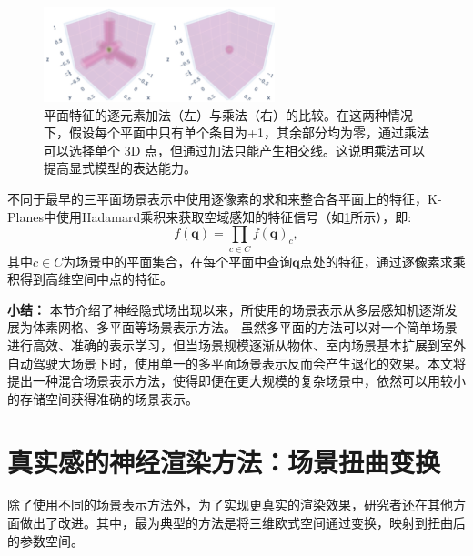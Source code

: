 \begin{figure}[ht]
    \centering
    \includegraphics[width=0.6\textwidth]{undergraduate-thesis/images/related-work/hadamard-product.png}
    \caption{平面特征的逐元素加法（左）与乘法（右）的比较。在这两种情况下，假设每个平面中只有单个条目为+1，其余部分均为零，通过乘法可以选择单个 3D 点，但通过加法只能产生相交线。这说明乘法可以提高显式模型的表达能力\cite{fridovich-keil_k-planes_2023}。}
    \label{fig:related-work hadamard-product}
\end{figure}

不同于最早的三平面场景表示\cite{chan_efficient_2022}中使用逐像素的求和来整合各平面上的特征，K-Planes中使用Hadamard乘积来获取空域感知的特征信号（如\ref{fig:related-work hadamard-product}所示），即:
\begin{equation}
    f(\mathbf{q}) = \prod_{c\in C}f(\mathbf{q})_c,
\end{equation}
其中$c\in C$为场景中的平面集合，在每个平面中查询$\mathbf{q}$点处的特征，通过逐像素求乘积得到高维空间中点的特征。

\noindent\textbf{小结：}
本节介绍了神经隐式场出现以来，所使用的场景表示从多层感知机\cite{mildenhall_nerf_2020,park_deepsdf_2019, mescheder_occupancy_2019, shim_snerl_2023, zhi_-place_2021}逐渐发展为体素网格\cite{fridovich-keil_plenoxels_2022,yu_monosdf_2022,muller_instant_2022,jiang_instantavatar_2022}、多平面\cite{chen_tensorf_2022,fridovich-keil_k-planes_2023,cao_hexplane_2023}等场景表示方法。
虽然多平面的方法可以对一个简单场景进行高效、准确的表示学习，但当场景规模逐渐从物体、室内场景基本扩展到室外自动驾驶大场景下时，使用单一的多平面场景表示反而会产生退化的效果。本文将提出一种混合场景表示方法，使得即便在更大规模的复杂场景中，依然可以用较小的存储空间获得准确的场景表示。


\section{真实感的神经渲染方法：场景扭曲变换}
\label{sec: related-work realistic rendering}
除了使用不同的场景表示方法外，为了实现更真实的渲染效果，研究者还在其他方面做出了改进。其中，最为典型的方法是将三维欧式空间通过变换，映射到扭曲后的参数空间。

